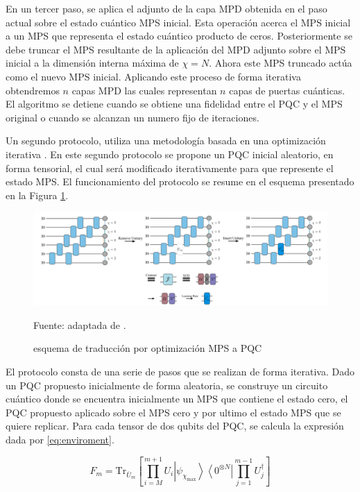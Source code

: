 En un tercer paso, se aplica el adjunto de la capa MPD obtenida en el paso actual sobre el estado cuántico MPS inicial. Esta operación acerca el MPS inicial a un MPS que representa el estado cuántico producto de ceros. Posteriormente se debe truncar el MPS resultante de la aplicación del MPD adjunto sobre el MPS inicial a la dimensión interna máxima de $\chi=N$. Ahora este MPS truncado actúa como el nuevo MPS inicial. Aplicando este proceso de forma iterativa obtendremos $n$ capas MPD las cuales representan $n$ capas de puertas cuánticas. El algoritmo se detiene cuando se obtiene una fidelidad entre el \mbox{PQC} y el MPS original o cuando se alcanzan un numero fijo de iteraciones.

\newpage

Un segundo protocolo, utiliza una metodología basada en una optimización iterativa \citep{shirakawa}. En este segundo protocolo se propone un \mbox{PQC} inicial aleatorio, en forma tensorial, el cual será modificado iterativamente para que represente el estado MPS. El funcionamiento del protocolo se resume en el esquema presentado en la Figura \ref{fig:mps_to_pqc_o}.


\begin{figure}[!h]
    \centering
    \includegraphics[scale = 0.6]{img/05-mps_to_pqc_o.png}
    \caption{esquema de traducción por optimización MPS a \mbox{PQC}}
    Fuente: adaptada de \cite{rudolph}.
    \label{fig:mps_to_pqc_o}
\end{figure}

El protocolo consta de una serie de pasos que se realizan de forma iterativa. Dado un \mbox{PQC} propuesto inicialmente de forma aleatoria, se construye un circuito cuántico donde se encuentra inicialmente un MPS que contiene el estado cero, el \mbox{PQC} propuesto aplicado sobre el MPS cero y por ultimo el estado MPS que se quiere replicar. Para cada tensor de dos qubits del \mbox{PQC}, se calcula la expresión dada por \ref{eq:enviroment}.


\begin{equation}
    \hat{F}_m = \mathrm{Tr}_{\bar{U}_m} \left[ \prod_{i=M}^{m+1} U_i \left| \psi_{\chi_{\max}} \right\rangle \left\langle 0^{\otimes N} \right| \prod_{j=1}^{m-1} U_j^\dagger \right]
    \label{eq:enviroment}
\end{equation}

